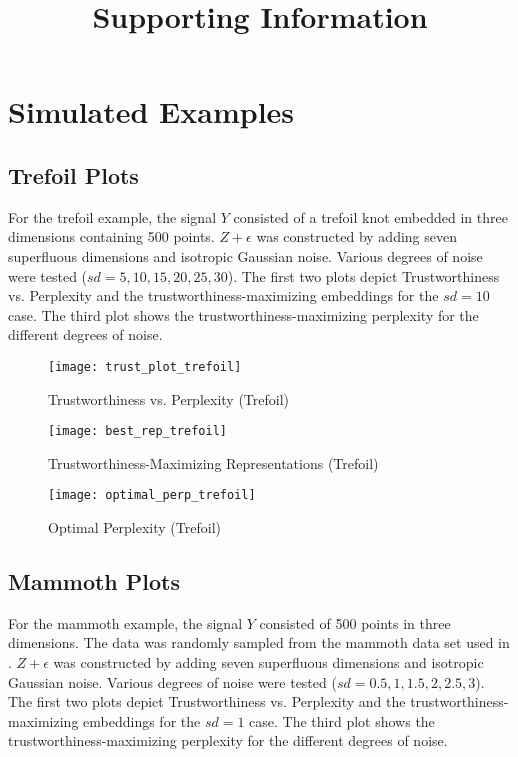 \documentclass{article}
\title{Supporting Information}
\date{}
\renewcommand{\thesection}{S\Roman{section}}
\renewcommand{\thefigure}{S\arabic{figure}}
\begin{document}
\maketitle		

\setcounter{section}{0}
\setcounter{figure}{0}
\renewcommand{\thesection}{S\Roman{section}}
\renewcommand{\thefigure}{S\arabic{figure}}

\section{Simulated Examples}
\subsection{Trefoil Plots}
For the trefoil example, the signal $Y$ consisted of a trefoil knot embedded in three dimensions containing 500 points. $Z + \epsilon$ was constructed by adding seven superfluous dimensions and isotropic Gaussian noise. Various degrees of noise were tested ($sd = 5, 10, 15, 20, 25, 30$). The first two plots depict Trustworthiness vs. Perplexity and the trustworthiness-maximizing embeddings for the $sd = 10$ case. The third plot shows the trustworthiness-maximizing perplexity for the different degrees of noise.

\begin{figure}[H]
\centering
\texttt{[image: trust\_plot\_trefoil]}
\caption{Trustworthiness vs. Perplexity (Trefoil)}
\end{figure}

\begin{figure}[H]
\centering
\texttt{[image: best\_rep\_trefoil]}
\caption{Trustworthiness-Maximizing Representations (Trefoil)}
\end{figure}

\begin{figure}[H]
\centering
\texttt{[image: optimal\_perp\_trefoil]}
\caption{Optimal Perplexity (Trefoil)}
\end{figure}

\subsection{Mammoth Plots}
For the mammoth example, the signal $Y$ consisted of 500 points in three dimensions. The data was randomly sampled from the mammoth data set used in \cite{understanding DR}. $Z + \epsilon$ was constructed by adding seven superfluous dimensions and isotropic Gaussian noise. Various degrees of noise were tested ($sd = 0.5, 1, 1.5, 2, 2.5, 3$). The first two plots depict Trustworthiness vs. Perplexity and the trustworthiness-maximizing embeddings for the $sd = 1$ case. The third plot shows the trustworthiness-maximizing perplexity for the different degrees of noise.
\end{document}
